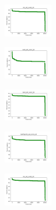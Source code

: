 \vspace*{\fill}
\newpage
\vspace*{\fill}

\begin{figure}[H]
    \centering
    \begin{subfigure}
        \centering
        \includegraphics[width=0.234\textwidth]{img/HS-LS/iris_set_const_20_949004259_cost.png}
    \end{subfigure}
    \hfill
    \begin{subfigure}
        \centering
        \includegraphics[width=0.234\textwidth]{img/HS-LS/ecoli_set_const_20_949004259_cost.png}
    \end{subfigure}
    \hfill
    \begin{subfigure}
        \centering
        \includegraphics[width=0.234\textwidth]{img/HS-LS/rand_set_const_20_949004259_cost.png}
    \end{subfigure}
    \hfill
    \begin{subfigure}
        \centering
        \includegraphics[width=0.234\textwidth]{img/HS-LS/newthyroid_set_const_20_949004259_cost.png}
    \end{subfigure}
    \hfill
    \begin{subfigure}
        \centering
        \includegraphics[width=0.234\textwidth]{img/HS-LS/iris_set_const_20_589741062_cost.png}

\end{subfigure}
\end{figure}
